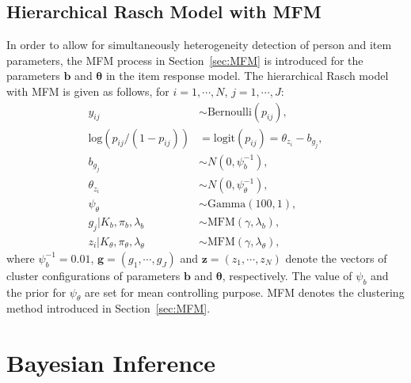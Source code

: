\documentclass[12pt]{article}
\begin{document}
\subsection{Hierarchical Rasch Model with MFM}\label{sec:hierachical}

In order to allow for simultaneously heterogeneity detection of person and item parameters, the MFM process in Section~\ref{sec:MFM} is introduced for the parameters $\bm{b}$ and $\bm{\theta}$ in the item response model. The hierarchical Rasch model with MFM is given as follows, for $i = 1, \cdots, N$, $j = 1, \cdots, J$:
\begin{equation}
	\begin{split}
			y_{ij} &\sim \text{Bernoulli}(p_{ij}),\\
	\text{log}(p_{ij}/(1-p_{ij})) &= \text{logit}(p_{ij}) = \theta_{z_i} - b_{g_j},\\
	b_{g_j} &\sim N(0, \psi_b^{-1}), \\
	\theta_{z_i} &\sim N(0, \psi_{\theta}^{-1}),\\
	\psi_{\theta} &\sim \text{Gamma}(100, 1),\\
	g_j|K_b, \pi_b, \lambda_b &\sim \text{MFM}(\gamma,\lambda_b),\\
	z_i|K_{\theta}, \pi_{\theta}, \lambda_{\theta} &\sim \text{MFM}(\gamma,\lambda_\theta),
	\end{split}
	\label{eq:hierachial_model}
\end{equation}
where $\psi_b^{-1}=0.01$, $\bm{g}=(g_1, \cdots, g_J)$ and $\bm{z}=(z_1, \cdots, z_N)$ denote the vectors of cluster configurations of parameters $\bm{b}$ and $\bm{\theta}$, respectively. 
The value of $\psi_{b}$ and the prior for $\psi_{\theta}$ are set for mean controlling purpose. 
MFM denotes the clustering method introduced in Section~\ref{sec:MFM}. 

\section{Bayesian  Inference}\label{sec:bayesian_inference} 
\end{document}
